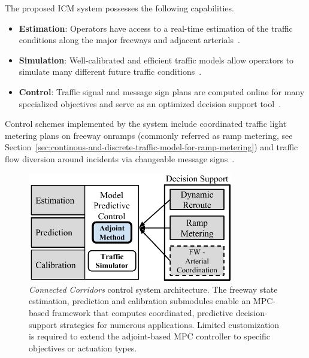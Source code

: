 The proposed ICM system possesses the following capabilities.

\begin{itemize}
	\item \textbf{Estimation}: Operators have access to a real-time estimation of the traffic conditions along the major freeways and adjacent arterials~\cite{work2010traffic,Jacqueta}.
	\item \textbf{Simulation}: Well-calibrated and efficient traffic models allow operators to simulate many different future traffic conditions~\cite{Muralidharan2009b,dervisoglu2014macroscopic}.
	\item \textbf{Control}: Traffic signal and message sign plans are computed online for many specialized objectives and serve as an optimized decision support tool~\cite{Reilly2013b,Reilly2014b}.
\end{itemize}

Control schemes implemented by the system include coordinated traffic light metering plans on freeway onramps (commonly referred as ramp metering, see Section~\ref{sec:continous-and-discrete-traffic-model-for-ramp-metering}) and traffic flow diversion around incidents via changeable message signs~\cite{Samaranayake2014}. 

\begin{figure}[htbp]
	\centering
	\includegraphics[width=0.8\textwidth]{diagrams/f2}
	\caption{\emph{Connected Corridors} control system architecture. The freeway state estimation, prediction and calibration submodules enable an MPC-based framework that computes coordinated, predictive decision-support strategies for numerous applications. Limited customization is required to extend the adjoint-based MPC controller to specific objectives or actuation types.}
	\label{fig:decision-support}
\end{figure}

